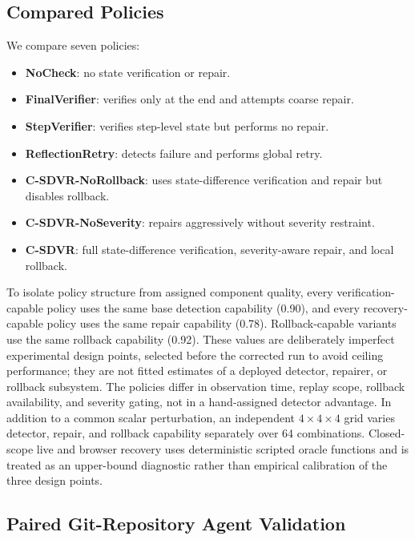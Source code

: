 \documentclass[pdflatex,sn-apa]{sn-jnl}
\begin{document}
\subsection{Compared Policies}

We compare seven policies:
\begin{itemize}[leftmargin=*]
  \item \textbf{NoCheck}: no state verification or repair.
  \item \textbf{FinalVerifier}: verifies only at the end and attempts coarse repair.
  \item \textbf{StepVerifier}: verifies step-level state but performs no repair.
  \item \textbf{ReflectionRetry}: detects failure and performs global retry.
  \item \textbf{C-SDVR-NoRollback}: uses state-difference verification and repair but disables rollback.
  \item \textbf{C-SDVR-NoSeverity}: repairs aggressively without severity restraint.
  \item \textbf{C-SDVR}: full state-difference verification, severity-aware repair, and local rollback.
\end{itemize}

To isolate policy structure from assigned component quality, every verification-capable policy uses the same base detection capability (0.90), and every recovery-capable policy uses the same repair capability (0.78). Rollback-capable variants use the same rollback capability (0.92). These values are deliberately imperfect experimental design points, selected before the corrected run to avoid ceiling performance; they are not fitted estimates of a deployed detector, repairer, or rollback subsystem. The policies differ in observation time, replay scope, rollback availability, and severity gating, not in a hand-assigned detector advantage. In addition to a common scalar perturbation, an independent $4\times4\times4$ grid varies detector, repair, and rollback capability separately over 64 combinations. Closed-scope live and browser recovery uses deterministic scripted oracle functions and is treated as an upper-bound diagnostic rather than empirical calibration of the three design points.

\subsection{Paired Git-Repository Agent Validation}
\end{document}
